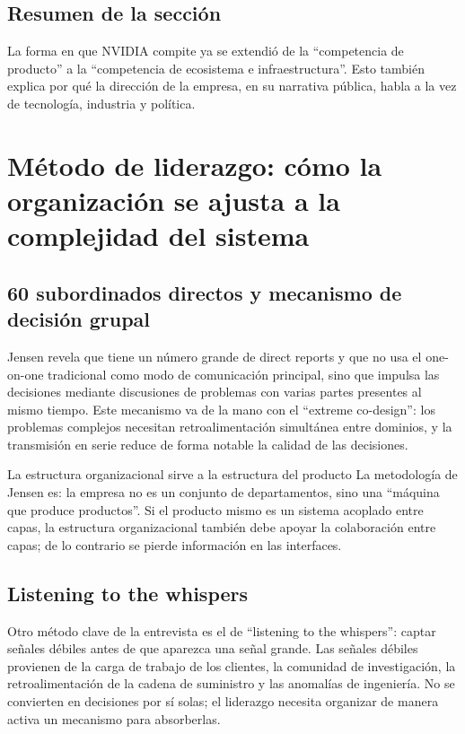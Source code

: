 \documentclass[a4paper]{article}
\begin{document}
\subsection{Resumen de la sección}

La forma en que NVIDIA compite ya se extendió de la ``competencia de producto'' a la ``competencia de ecosistema e infraestructura''. Esto también explica por qué la dirección de la empresa, en su narrativa pública, habla a la vez de tecnología, industria y política.

\section{Método de liderazgo: cómo la organización se ajusta a la complejidad del sistema}

\subsection{60 subordinados directos y mecanismo de decisión grupal}

Jensen revela que tiene un número grande de direct reports y que no usa el one-on-one tradicional como modo de comunicación principal, sino que impulsa las decisiones mediante discusiones de problemas con varias partes presentes al mismo tiempo. Este mecanismo va de la mano con el ``extreme co-design'': los problemas complejos necesitan retroalimentación simultánea entre dominios, y la transmisión en serie reduce de forma notable la calidad de las decisiones.

\begin{importantbox}{La estructura organizacional sirve a la estructura del producto}
La metodología de Jensen es: la empresa no es un conjunto de departamentos, sino una ``máquina que produce productos''. Si el producto mismo es un sistema acoplado entre capas, la estructura organizacional también debe apoyar la colaboración entre capas; de lo contrario se pierde información en las interfaces.
\end{importantbox}

\subsection{Listening to the whispers}

Otro método clave de la entrevista es el de ``listening to the whispers'': captar señales débiles antes de que aparezca una señal grande. Las señales débiles provienen de la carga de trabajo de los clientes, la comunidad de investigación, la retroalimentación de la cadena de suministro y las anomalías de ingeniería. No se convierten en decisiones por sí solas; el liderazgo necesita organizar de manera activa un mecanismo para absorberlas.
\end{document}
